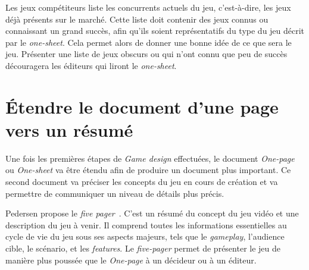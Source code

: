 
Les jeux compétiteurs liste les concurrents actuels du jeu, c'est-\`a-dire, les jeux déjà présents sur le marché.
Cette liste doit contenir des jeux connus ou connaissant un grand succès, afin qu'ils soient représentatifs du type du jeu d\'ecrit par le \emph{one-sheet}.
Cela permet alors de donner une bonne idée de ce que sera le jeu.
Présenter une liste de jeux obscurs ou qui n'ont connu que peu de succès découragera les éditeurs qui liront le \emph{one-sheet}.




\section{Étendre le document d'une page vers un résumé}
Une fois les premières étapes de \emph{Game design} effectuées, le document \emph{One-page} ou \emph{One-sheet} va être étendu afin de produire un document plus important.
Ce second document va préciser les concepts du jeu en cours de création et va permettre de communiquer un niveau de détails plus précis.

Pedersen propose le \emph{five pager}~\cite{GD_foundations_pedersen}. C'est un résumé du concept du jeu vidéo et une description du jeu à venir.
Il comprend toutes les informations essentielles au cycle de vie du jeu sous ses aspects majeurs, tels que le \emph{gameplay}, l'audience cible, le scénario, et les \emph{features}.
Le \emph{five-pager} permet de présenter le jeu de manière plus poussée que le \emph{One-page} à un décideur ou à un éditeur.







